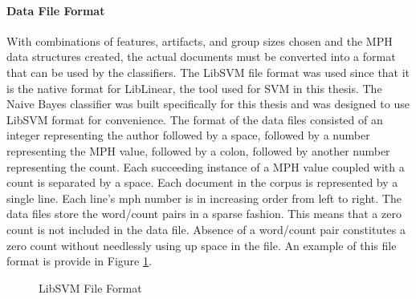 		\paragraph{Data File Format}With combinations of features, artifacts, and group sizes chosen and the MPH data structures created, the actual documents must be converted into a format that can be used by the classifiers. The LibSVM file format was used since that it is the native format for LibLinear, the tool used for SVM in this thesis.  The Naive Bayes classifier was built specifically for this thesis and was designed to use LibSVM format for convenience. The format of the data files consisted of an integer representing the author followed by a space, followed by a number representing the MPH value, followed by a colon, followed by another number representing the count.  Each succeeding instance of a MPH value coupled with a count is separated by a space.  Each document in the corpus is represented by a single line.  Each line's mph number is in increasing order from left to right.  The data files store the word/count pairs in a sparse fashion.  This means that a zero count is not included in the data file.  Absence of a word/count pair constitutes a zero count without needlessly using up space in the file.  An example of this file format is provide in Figure \ref{fig:svmFormat}.
		\begin{figure}[h!]
			\begin{center}
				\caption{LibSVM File Format}
				\label{fig:svmFormat}
			\end{center}
		\end{figure}
	
